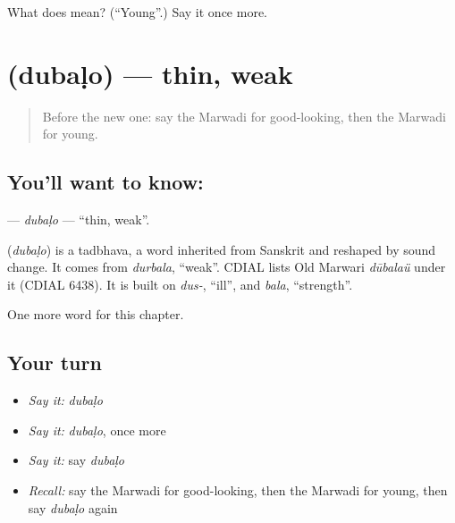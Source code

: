 \begin{tcolorbox}[breakable,colback=teal!4,colframe=teal!35!black,title={Before you move on}]
What does  mean? (\textquotedblleft{}Young\textquotedblright{}.) Say it once more.
\end{tcolorbox}
\section[\texorpdfstring{\mw{दुबळो} (dubaḷo)}{दुबळो (dubaḷo)}]{ (dubaḷo) — thin, weak}

\label{lesson:MW-C144-dubalo}



\begin{quote}
Before the new one: say the Marwadi for good-looking, then the Marwadi for young.
\end{quote}

\subsection*{You'll want to know: }
\textbf{} — \emph{dubaḷo} — \textquotedblleft{}thin, weak\textquotedblright{}.

\begin{cousinweb}
\textbf{} (\emph{dubaḷo}) is a tadbhava, a word inherited from Sanskrit and reshaped by sound change. It comes from \emph{durbala}, \textquotedblleft{}weak\textquotedblright{}. CDIAL lists Old Marwari \emph{dūbalaü} under it (CDIAL 6438). It is built on \emph{dus-}, \textquotedblleft{}ill\textquotedblright{}, and \emph{bala}, \textquotedblleft{}strength\textquotedblright{}.
\end{cousinweb}

\begin{grammarlens}[title={What you've built}]
One more word for this chapter.
\end{grammarlens}

\subsection*{Your turn}
\begin{itemize}
\raggedright
  \item \emph{Say it:} \emph{dubaḷo}
  \item \emph{Say it:} \emph{dubaḷo}, once more
  \item \emph{Say it:} say \emph{dubaḷo}
  \item \emph{Recall:} say the Marwadi for good-looking, then the Marwadi for young, then say \emph{dubaḷo} again
\end{itemize}

